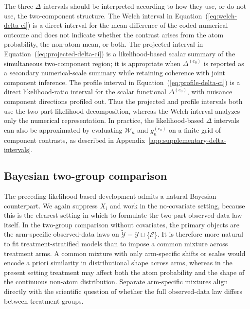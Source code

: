 \documentclass[11pt]{article}
\begin{document}
The three $\Delta$ intervals should be interpreted according to how they use, or do not use, the two-component structure. The Welch interval in Equation~(\ref{eq:welch-delta-ci}) is a direct interval for the mean difference of the coded numerical outcome and does not indicate whether the contrast arises from the atom probability, the non-atom mean, or both. The projected interval in Equation~(\ref{eq:projected-delta-ci}) is a likelihood-based scalar summary of the simultaneous two-component region; it is appropriate when $\Delta^{(e_0)}$ is reported as a secondary numerical-scale summary while retaining coherence with joint component inference. The profile interval in Equation~(\ref{eq:profile-delta-ci}) is a direct likelihood-ratio interval for the scalar functional $\Delta^{(e_0)}$, with nuisance component directions profiled out. Thus the projected and profile intervals both use the two-part likelihood decomposition, whereas the Welch interval analyzes only the numerical representation. In practice, the likelihood-based $\Delta$ intervals can also be approximated by evaluating $\mathcal{W}_n$ and $g_n^{(e_0)}$ on a finite grid of component contrasts, as described in Appendix~\ref{app:supplementary-delta-intervals}.

\subsection{Bayesian two-group comparison}\label{sec:bayesian-two-group}

The preceding likelihood-based development admits a natural Bayesian counterpart. We again suppress $X_i$ and work in the no-covariate setting, because this is the clearest setting in which to formulate the two-part observed-data law itself. In the two-group comparison without covariates, the primary objects are the arm-specific observed-data laws on $\widetilde{\mathcal{Y}}=\mathcal{Y}\sqcup\{\mathcal{E}\}$. It is therefore more natural to fit treatment-stratified models than to impose a common mixture across treatment arms. A common mixture with only arm-specific shifts or scales would encode a priori similarity in distributional shape across arms, whereas in the present setting treatment may affect both the atom probability and the shape of the continuous non-atom distribution. Separate arm-specific mixtures align directly with the scientific question of whether the full observed-data law differs between treatment groups.
\end{document}

